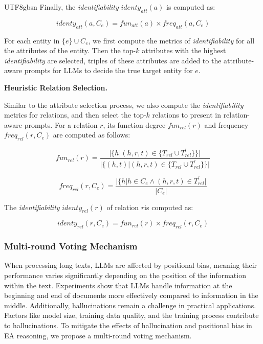 \documentclass[preprint,12pt]{elsarticle}
\begin{document}
\begin{CJK}{UTF8}{gbsn}
Finally, the \textit{identifiability} $identy_{att}(a)$ is computed as:

\begin{equation}
\label{eq:D}
    identy_{att}(a, C_e)=fun_{att}(a) \times freq_{att}(a,C_e)
\end{equation}

For each entity in $\{e\}\cup C_e$, we first compute the metrics of \textit{identifiability} for all the attributes of the entity. Then the top-$k$ attributes with the highest \textit{identifiability} are selected, triples of these attributes are added to the attribute-aware prompts for LLMs to decide the true target entity for $e$.

\noindent\textbf{Heuristic Relation Selection.}

Similar to the attribute selection process, we also compute the \textit{identifiability} metrics for relations, and then select the top-$k$ relations to present in relation-aware prompts. For a relation $r$, its function degree $fun_{rel}(r)$ and frequency $freq_{rel}(r,C_e)$ are computed as follows:


\begin{equation}
\label{eq:rfun}
fun_{rel}(r)=\frac{|\{h|(h,r,t)\in \{T_{rel} \cup T_{rel}^{\prime}\}\}|}{|\{(h,t)|(h,r,t)\in \{T_{rel} \cup T_{rel}^{\prime}\}\}|}%
\end{equation}

\begin{equation}
\label{eq:rfreq}
    freq_{rel}(r,C_e)=\frac{|\{h|h\in C_e \land (h,r,t)\in T_{rel}^{\prime}|}{|C_e|}%
\end{equation}

The \textit{identifiability} $identy_{rel}(r)$ of relation $r$is computed as:

\begin{equation}
\label{eq:idrel}
    identy_{rel}(r, C_e)=fun_{rel}(r) \times freq_{rel}(r,C_e)
\end{equation}

\subsubsection{Multi-round Voting Mechanism}
\label{sec:mrvoting}
When processing long texts, LLMs are affected by positional bias, meaning their performance varies significantly depending on the position of the information within the text. Experiments show that LLMs handle information at the beginning and end of documents more effectively compared to information in the middle. Additionally, hallucinations remain a challenge in practical applications. Factors like model size, training data quality, and the training process contribute to hallucinations. To mitigate the effects of hallucination and positional bias in EA reasoning, we propose a multi-round voting mechanism. 


\end{CJK}
\end{document}
